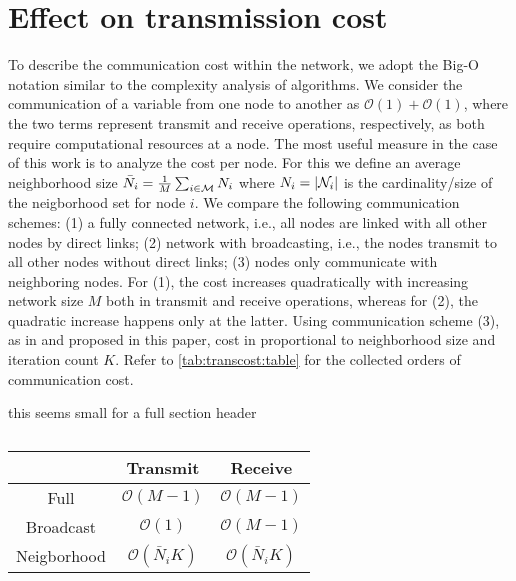\documentclass{article}
\begin{document}
\section{Effect on transmission cost}
\label{sec:transcost}
To describe the communication cost within the network, we adopt the Big-O notation similar to the complexity analysis of algorithms.
We consider the communication of a variable from one node to another as \(\mathcal{O}(1)+\mathcal{O}(1)\), where the two terms represent transmit and receive operations, respectively, as both require computational resources at a node.
The most useful measure in the case of this work is to analyze the cost per node.
For this we define an average neighborhood size \(\bar{N}_i = \frac{1}{M} \sum_{i \in \mathcal{M}} N_i\) where \(N_i = | \mathcal{N}_i |\) is the cardinality/size of the neigborhood set for node \(i\).
We compare the following communication schemes: (1) a fully connected network, i.e., all nodes are linked with all other nodes by direct links; (2) network with broadcasting, i.e., the nodes transmit to all other nodes without direct links; (3) nodes only communicate with neighboring nodes.
For (1), the cost increases quadratically with increasing network size \(M\) both in transmit and receive operations, whereas for (2), the quadratic increase happens only at the latter.
Using communication scheme (3), as in \cite{yuDistributedBlindSystem2014,liuDistributedBlindIdentification2016} and proposed in this paper, cost in proportional to neighborhood size and iteration count \(K\).
Refer to \autoref{tab:transcost:table} for the collected orders of communication cost.
\begin{todo}
    this seems small for a full section header
\end{todo}
\begin{table}
    \centering
    \begin{tabular}{ |c|c|c| } 
        \hline
        & Transmit & Receive \\
        \hline\hline
        Full & \(\mathcal{O}(M-1)\) & \(\mathcal{O}(M-1)\) \\
        \hline
        Broadcast & \(\mathcal{O}(1)\) & \(\mathcal{O}(M-1)\) \\ 
        \hline
        Neigborhood & \(\mathcal{O}(\bar{N}_i K)\) & \(\mathcal{O}(\bar{N}_i K)\) \\ 
        \hline
    \end{tabular}
    \caption[]{}
    \label{tab:transcost:table}
\end{table}
\end{document}
